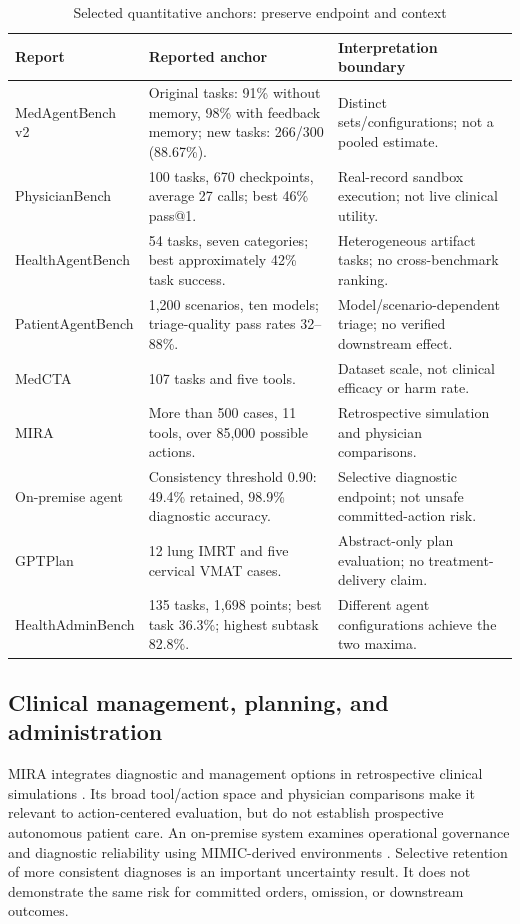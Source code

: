 \begin{table}[t]\caption{Selected quantitative anchors: preserve endpoint and context}\label{tab:anchors}\centering\footnotesize
\begin{tabularx}{\textwidth}{@{}p{}p{}Y@{}}\toprule
Report & Reported anchor & Interpretation boundary \\ \midrule
MedAgentBench v2 \cite{medagentbenchv2} & Original tasks: 91\% without memory, 98\% with feedback memory; new tasks: 266/300 (88.67\%). & Distinct sets/configurations; not a pooled estimate.\\
PhysicianBench \cite{physicianbench2026} & 100 tasks, 670 checkpoints, average 27 calls; best 46\% pass@1. & Real-record sandbox execution; not live clinical utility.\\
HealthAgentBench \cite{healthagentbench2026} & 54 tasks, seven categories; best approximately 42\% task success. & Heterogeneous artifact tasks; no cross-benchmark ranking.\\
PatientAgentBench \cite{patientagentbench2026} & 1,200 scenarios, ten models; triage-quality pass rates 32--88\%. & Model/scenario-dependent triage; no verified downstream effect.\\
MedCTA \cite{medcta2026} & 107 tasks and five tools. & Dataset scale, not clinical efficacy or harm rate.\\
MIRA \cite{mira2026} & More than 500 cases, 11 tools, over 85,000 possible actions. & Retrospective simulation and physician comparisons.\\
On-premise agent \cite{onprem2026} & Consistency threshold 0.90: 49.4\% retained, 98.9\% diagnostic accuracy. & Selective diagnostic endpoint; not unsafe committed-action risk.\\
GPTPlan \cite{gptplan2025} & 12 lung IMRT and five cervical VMAT cases. & Abstract-only plan evaluation; no treatment-delivery claim.\\
HealthAdminBench \cite{healthadmin2026} & 135 tasks, 1,698 points; best task 36.3\%; highest subtask 82.8\%. & Different agent configurations achieve the two maxima.\\ \bottomrule
\end{tabularx}\end{table}

\subsection{Clinical management, planning, and administration}
MIRA integrates diagnostic and management options in retrospective clinical simulations \cite{mira2026}. Its broad tool/action space and physician comparisons make it relevant to action-centered evaluation, but do not establish prospective autonomous patient care. An on-premise system examines operational governance and diagnostic reliability using MIMIC-derived environments \cite{onprem2026,mimiciv2023}. Selective retention of more consistent diagnoses is an important uncertainty result. It does not demonstrate the same risk for committed orders, omission, or downstream outcomes.

